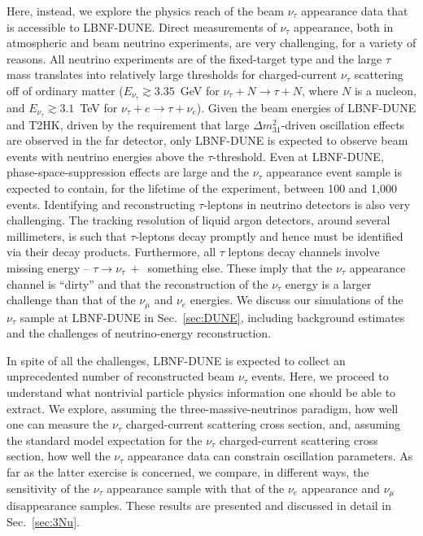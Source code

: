 \documentclass[aps,prd,onecolumn,nofootinbib,superscriptaddress, 11pt]{revtex4}
\begin{document}
Here, instead, we explore the physics reach of the beam $\nu_{\tau}$ appearance data that is accessible to LBNF-DUNE. Direct measurements of $\nu_{\tau}$ appearance, both in atmospheric and beam neutrino experiments, are very challenging, for a variety of reasons. All neutrino experiments are of the fixed-target type and the large $\tau$ mass translates into relatively large thresholds for charged-current $\nu_{\tau}$ scattering off of ordinary matter ($E_{\nu_{\tau}}\gtrsim 3.35$~GeV for $\nu_{\tau}+N\to\tau+N$, where $N$ is a nucleon, and $E_{\nu_{\tau}}\gtrsim3.1$~TeV for $\nu_{\tau}+e\to\tau+\nu_e$). Given the beam energies of LBNF-DUNE and T2HK, driven by the requirement that large $\Delta m_{31}^2$-driven oscillation effects are observed in the far detector, only LBNF-DUNE is expected to observe beam events with neutrino energies above the $\tau$-threshold. Even at LBNF-DUNE, phase-space-suppression effects are large and the $\nu_{\tau}$ appearance event sample is expected to contain, for the lifetime of the experiment, between 100 and 1,000 events. Identifying and reconstructing $\tau$-leptons in neutrino detectors is also very challenging. The tracking resolution of liquid argon detectors, around several millimeters,  is such that $\tau$-leptons decay promptly and hence must be identified via their decay products. Furthermore, all $\tau$ leptons decay channels involve missing energy -- $\tau\to\nu_{\tau}~+$~something else. These imply that the $\nu_{\tau}$ appearance channel is ``dirty'' and that the reconstruction of the $\nu_{\tau}$ energy is a larger challenge than that of the $\nu_{\mu}$ and $\nu_e$  energies. We discuss our simulations of the $\nu_{\tau}$ sample at LBNF-DUNE in Sec.~\ref{sec:DUNE}, including background estimates and the challenges of neutrino-energy reconstruction. 

In spite of all the challenges, LBNF-DUNE is expected to collect an unprecedented number of reconstructed beam $\nu_{\tau}$ events. Here, we proceed to understand what nontrivial particle physics information one should be able to extract. We explore, assuming the three-massive-neutrinos paradigm, how well one can measure the $\nu_{\tau}$ charged-current scattering cross section, and, assuming the standard model expectation for the $\nu_{\tau}$ charged-current scattering cross section, how well the $\nu_{\tau}$ appearance data can constrain oscillation parameters. As far as the latter exercise is concerned, we compare, in different ways, the sensitivity of the $\nu_{\tau}$ appearance sample with that of the $\nu_{e}$ appearance and $\nu_{\mu}$ disappearance samples. These results are presented and discussed in detail in Sec.~\ref{sec:3Nu}.
\end{document}
